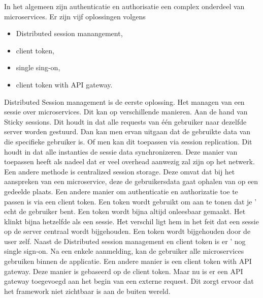 In het algemeen zijn authenticatie en authorisatie een complex onderdeel van microservices.
Er zijn vijf oplossingen volgens \textcite{Ayoub2018}
\begin{itemize}
	\item Distributed session manangement,
	\item client token,
	\item single sing-on, 
	\item client token with API gateway.
\end{itemize}
Distributed Session management is de eerste oplossing. Het managen van een sessie over microservices. Dit kan op verschillende manieren. Aan de hand van Sticky sessions. Dit houdt in dat alle requests van één gebruiker naar dezelfde server worden gestuurd. Dan kan men ervan uitgaan dat de gebruikte data van die specifieke gebruiker is. Of men kan dit toepassen via session replication. Dit houdt in dat alle instanties de sessie data synchronizeren. Deze manier van toepassen heeft als nadeel dat er veel overhead aanwezig zal zijn op het netwerk. Een andere methode is centralized session storage. Deze omvat dat bij het aanspreken van een microservice, deze de gebruikersdata gaat ophalen van op een gedeelde plaats. 
Een andere manier om authenticatie en authorizatie toe te passen is via een client token. Een token wordt gebruikt om aan te tonen dat je ' echt de gebruiker bent. Een token wordt bijna altijd onleesbaar gemaakt. Het klinkt bijna hetzelfde als een sessie. Het verschil ligt hem in het feit dat een sessie op de server centraal wordt bijgehouden. Een token wordt bijgehouden door de user zelf.
Naast de Distributed session management en client token is er ' nog single sign-on. Na een enkele aanmelding, kan de gebruiker alle microservices gebruiken binnen de applicatie. 
Een andere manier is een client token with API gateway. Deze manier is gebaseerd op de client token. Maar nu is er een API gateway toegevoegd aan het begin van een externe request. Dit zorgt ervoor dat het framework niet zichtbaar is aan de buiten wereld. 

